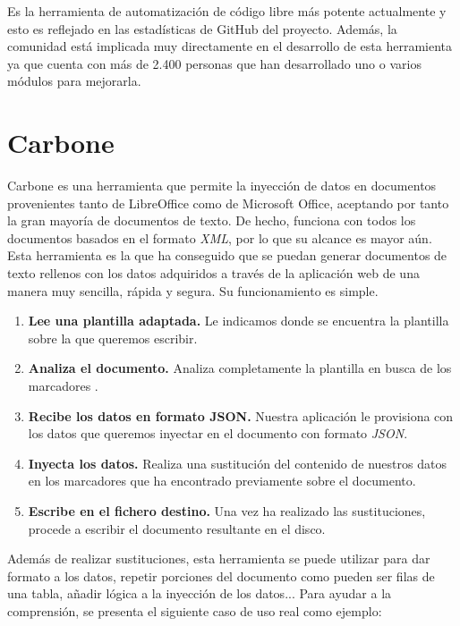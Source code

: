 Es la herramienta de automatización de código libre más potente actualmente y esto es reflejado
en las estadísticas de GitHub del proyecto. Además, la comunidad está implicada muy directamente
en el desarrollo de esta herramienta ya que cuenta con más de 2.400 personas que han desarrollado
uno o varios módulos para mejorarla.

\section{Carbone}

Carbone\cite{carbone} es una herramienta que permite la inyección de datos en documentos provenientes tanto de LibreOffice como de Microsoft Office, aceptando por tanto la gran mayoría de documentos de texto. De hecho, funciona con todos los documentos basados en el formato \textit{XML}, por lo que su alcance es mayor aún.\\

Esta herramienta es la que ha conseguido que se puedan generar documentos de texto rellenos con los datos adquiridos a través de la aplicación web de una manera muy sencilla, rápida y segura. Su funcionamiento es simple.\\

\begin{enumerate}
	\item \textbf{Lee una plantilla adaptada.} Le indicamos donde se encuentra la plantilla sobre la que queremos escribir. 
	\item \textbf{Analiza el documento.} Analiza completamente la plantilla en busca de los marcadores {}.  
	\item \textbf{Recibe los datos en formato JSON.} Nuestra aplicación le provisiona con los datos que queremos inyectar en el documento con formato \textit{JSON}.  
	\item \textbf{Inyecta los datos.} Realiza una sustitución del contenido de nuestros datos en los marcadores que ha encontrado previamente sobre el documento.
	\item \textbf{Escribe en el fichero destino.} Una vez ha realizado las sustituciones, procede a escribir el documento resultante en el disco. 
\end{enumerate}

Además de realizar sustituciones, esta herramienta se puede utilizar para dar formato a los datos, repetir porciones del documento como pueden ser filas de una tabla, añadir lógica a la inyección de los datos... Para ayudar a la comprensión, se presenta el siguiente caso de uso real como ejemplo:\\

